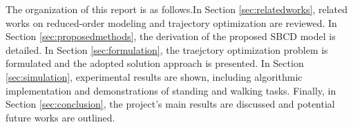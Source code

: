\documentclass[main.tex]{subfiles}
\begin{document}
The organization of this report is as follows.In Section \ref{sec:relatedworks}, related works on reduced-order modeling and trajectory optimization are reviewed. In Section \ref{sec:proposedmethods}, the derivation of the proposed SBCD model is detailed. In Section \ref{sec:formulation}, the traejctory optimization problem is formulated and the adopted solution approach is presented. In Section \ref{sec:simulation}, experimental results are shown, including algorithmic implementation and demonstrations of standing and walking tasks. Finally, in Section \ref{sec:conclusion}, the project's main results are discussed and potential future works are outlined.
\end{document}
